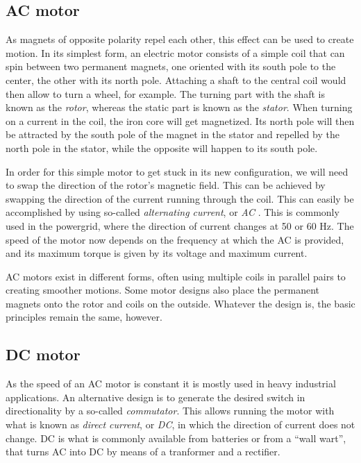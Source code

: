 \subsection{AC motor}
As magnets of opposite polarity repel each other, this effect can be used to create motion. In its simplest form, an electric motor consists of a simple coil that can spin between two permanent magnets, one oriented with its south pole to the center, the other with its north pole. Attaching a shaft to the central coil would then allow to turn a wheel, for example. The turning part with the shaft is known as the \emph{rotor}, whereas the static part is known as the \emph{stator}. When turning on a current in the coil, the iron core will get magnetized. Its north pole will then be attracted by the south pole of the magnet in the stator and repelled by the north pole in the stator, while the opposite will happen to its south pole.

In order for this simple motor to get stuck in its new configuration, we will need to swap the direction of the rotor's magnetic field. This can be achieved by swapping the direction of the current running through the coil. This can easily be accomplished by using so-called \emph{alternating current}, or \emph{AC} . This is commonly used in the powergrid, where the direction of current changes at 50 or 60 Hz. The speed of the motor now depends on the frequency at which the AC is provided, and its maximum torque is given by its voltage and maximum current. 

AC motors exist in different forms, often using multiple coils in parallel pairs to creating smoother motions. Some motor designs also place the permanent magnets onto the rotor and coils on the outside. Whatever the design is, the basic principles remain the same, however.

\subsection{DC motor}
As the speed of an AC motor is constant it is mostly used in heavy industrial applications. An alternative design is to generate the desired switch in directionality by a so-called \emph{commutator}. This allows running the motor with what is known as \emph{direct current}, or \emph{DC}, in which the direction of current does not change. DC is what is commonly available from batteries or from a ``wall wart'', that turns AC into DC by means of a tranformer and a rectifier. 

